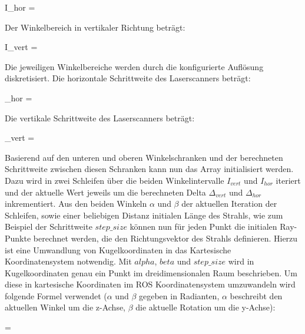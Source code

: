 \begin{myequation}
I_{hor} = 
\end{myequation}

Der Winkelbereich in vertikaler Richtung beträgt:

\begin{myequation}
I_{vert} = 
\end{myequation}

Die jeweiligen Winkelbereiche werden durch die konfigurierte Auflösung diskretisiert.
Die horizontale Schrittweite des Laserscanners beträgt:

\begin{myequation}
\Delta_{hor} = 
\end{myequation}

Die vertikale Schrittweite des Laserscanners beträgt:

\begin{myequation}
\Delta_{vert} = 
\end{myequation}

Basierend auf den unteren und oberen Winkelschranken und der berechneten Schrittweite zwischen diesen Schranken kann nun das Array initialisiert werden. Dazu wird in zwei Schleifen über die beiden Winkelintervalle $I_{vert}$ und $I_{hor}$ iteriert und der aktuelle Wert jeweils um die berechneten Delta $\Delta_{vert}$ und  $\Delta_{hor}$ inkrementiert. Aus den beiden Winkeln $\alpha$ und $\beta$ der aktuellen Iteration der Schleifen, sowie einer beliebigen Distanz initialen Länge des Strahls, wie zum Beispiel der Schrittweite $step\_size$ können nun für jeden Punkt die initialen Ray-Punkte berechnet werden, die den Richtungsvektor des Strahls definieren.
Hierzu ist eine Umwandlung von Kugelkoordinaten in das Kartesische Koordinatensystem notwendig. Mit $alpha$, $beta$ und $step\_size$ wird in Kugelkoordinaten genau ein Punkt im dreidimensionalen Raum beschrieben. Um diese in kartesische Koordinaten im ROS Koordinatensystem umzuwandeln wird folgende Formel verwendet ($\alpha$ und $\beta$ gegeben in Radianten, $\alpha$ beschreibt den aktuellen Winkel um die z-Achse, $\beta$ die aktuelle Rotation um die y-Achse):

\begin{myequation}
 =  \cdot \colvec{\cos\left(\alpha \right) \cdot \cos\left(\beta \right) \\ \sin\left(\alpha \right) \cdot \cos\left(\beta \right) \\ \sin\left(\beta \right)}
\end{myequation}

